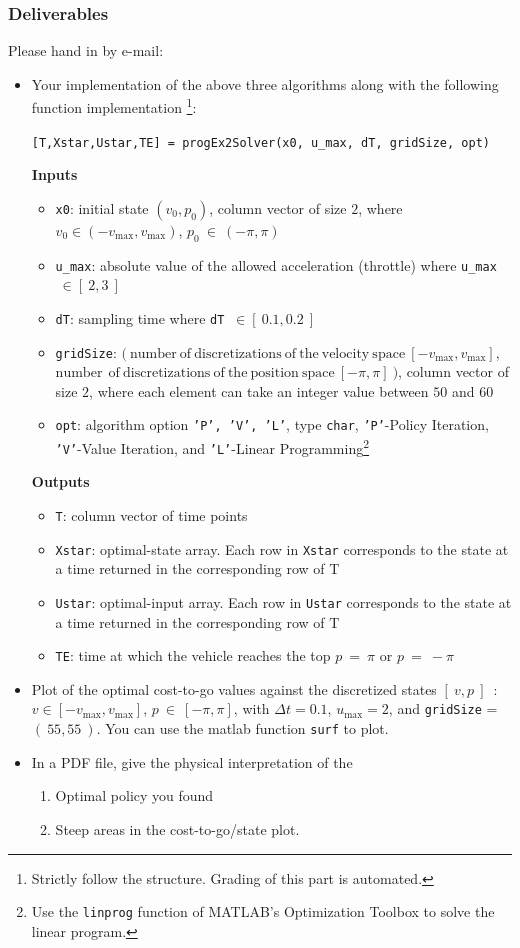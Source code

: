 \documentclass[uebung]{ETHIDSCprogramming_dpoc}
\begin{document}
\subsubsection*{Deliverables}
Please hand in by e-mail:
\begin{itemize}
\item Your implementation of the above three algorithms along with the following function implementation \footnote{Strictly follow the structure. Grading of this part is automated.}:
 
{\tt [T,Xstar,Ustar,TE] = progEx2Solver(x0, u\_max, dT, gridSize, opt)} 

\textbf{Inputs}
\begin{itemize}
\item {\tt x0}: initial state $(v_0, p_0)$, column vector of size $2$, where $v_0 \in (-v_\mathrm{max},v_\mathrm{max})$, $p_0~\in~(-\pi,\pi)$
\item {\tt u\_max}: absolute value of the allowed acceleration (throttle) where {\tt u\_max} $\ \in [\ 2,3\ ]$ 
\item {\tt dT}: sampling time where {\tt dT} $\ \in [\ 0.1,0.2\ ]$
\item {\tt gridSize}: $(\ \mathrm{number\ of\ discretizations\ of\ the\ velocity\ space}\ [-v_\mathrm{max},v_\mathrm{max}]$, $\mathrm{number\ \ of\ discretizations\ of\ the\ position\ space}\ [-\pi,\pi]\ )$, column vector of size $2$, where each element can take an integer value between $50$ and $60$
\item {\tt opt}: algorithm option {\tt 'P', 'V', 'L'}, type {\tt char}, {\tt 'P'}-Policy Iteration, {\tt 'V'}-Value Iteration, and {\tt 'L'}-Linear Programming\footnote{Use the {\tt linprog} function of MATLAB's Optimization Toolbox to solve the linear program.}
\end{itemize}
\textbf{Outputs}
\begin{itemize}
\item {\tt T}: column vector of time points
\item {\tt Xstar}: optimal-state array. Each row in {\tt Xstar} corresponds to the state at a time returned in the corresponding row of T
\item {\tt Ustar}: optimal-input array. Each row in {\tt Ustar} corresponds to the state at a time returned in the corresponding row of T
\item{\tt TE}: time at which the vehicle reaches the top $p\ =\ \pi $ or  $p\ =\ -\pi $
\end{itemize}
\item Plot of the optimal cost-to-go values against the discretized  states $[\ v, p\ ]$\ : $v \in [-v_\mathrm{max},v_\mathrm{max}]$, $p~\in~[-\pi,\pi]$, with $\Delta t = 0.1$, $u_{\mathrm{max}}=2$, and  {\tt gridSize} = $(\ 55, 55\ )$. You can use the matlab function {\tt surf} to plot.
\item In a PDF file, give the physical interpretation of the
\begin{enumerate}
\item Optimal policy you found 
\item Steep areas in the cost-to-go/state plot.
\end{enumerate}
\end{itemize}
\end{document}
